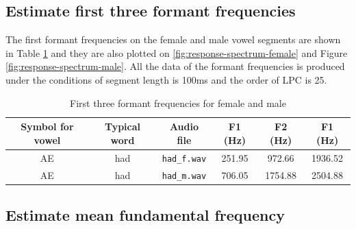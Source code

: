 \documentclass{article}
\begin{document}


\subsection{Estimate first three formant frequencies}

The first formant frequencies on the female and male vowel segments are shown in Table \ref{table:formant-frequency} and they are also plotted on \ref{fig:response-spectrum-female} and Figure \ref{fig:response-spectrum-male}. All the data of the formant frequencies is produced under the conditions of segment length is 100ms and the order of LPC is 25.

\begin{table}[ht]
\caption{First three formant frequencies for female and male} %
\centering %
\begin{tabular}{c c c c c c} %
\hline\hline %
Symbol for vowel & Typical word & Audio file & F1 (Hz) & F2 (Hz) & F1 (Hz) \\ [0.5ex] %
\hline %
AE & had & \verb+had_f.wav+ & 251.95 & 972.66 & 1936.52 \\ %
AE & had & \verb+had_m.wav+ & 706.05 & 1754.88 & 2504.88 \\ [1ex] %
\hline %
\end{tabular}
\label{table:formant-frequency}
\end{table}

\subsection{Estimate mean fundamental frequency}
\end{document}
